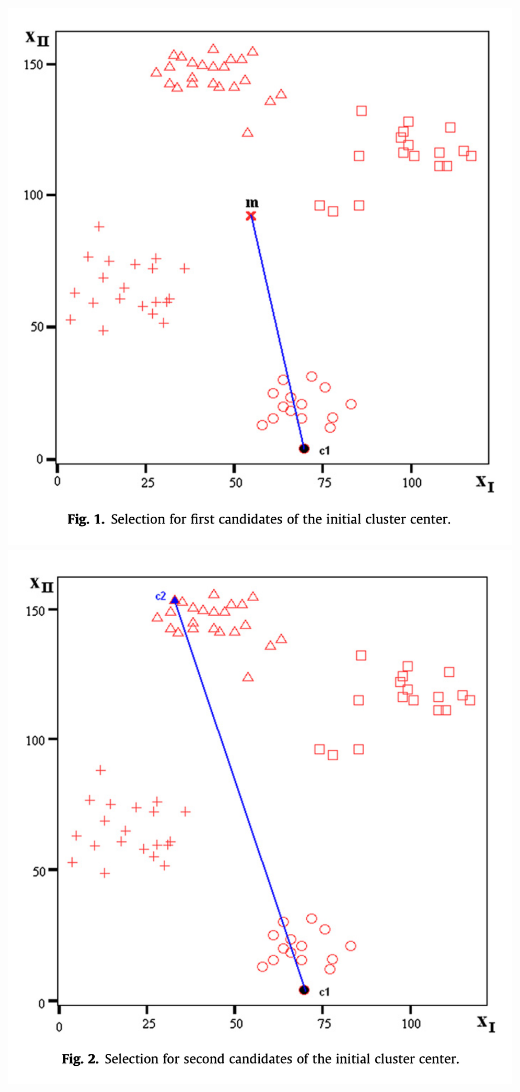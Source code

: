 \documentclass[12pt,letterpaper]{article}
\begin{document}
\vspace{.25cm}
\includegraphics[scale=0.4]{image1}
\includegraphics[scale=0.4]{image2}
\end{document}
